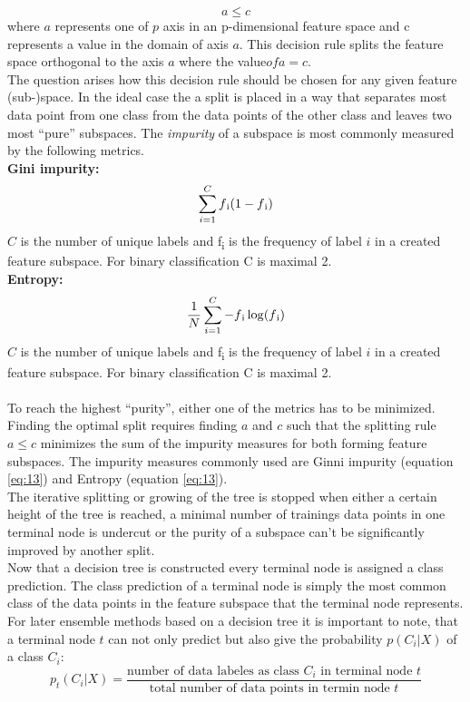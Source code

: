 \begin{equation} \label{eq:12}
a \leq c
\end{equation}
where $a$ represents one of $p$ axis in an p-dimensional feature space and c represents a value in the domain of axis $a$.
This decision rule splits the feature space orthogonal to the axis $a$ where the value$ of a = c$.
\\
The question arises how this decision rule should be chosen for any given feature (sub-)space.
In the ideal case the a split is placed in a way that separates most data point from one class from the data points of the other class and leaves two most ``pure'' subspaces. The \emph{impurity} of a subspace is most commonly measured by the following metrics. 
\\
\textbf{Gini impurity:}  \\
\begin{equation} \label{eq:13}
\sum_{i=1}^{C} f\textsubscript{i}(1-f\textsubscript{i})
\end{equation}
$C$ is the number of unique labels and f\textsubscript{i} is the frequency of label $i$ in a created feature subspace. For binary classification C is maximal 2.\\
\textbf{Entropy:}
\begin{equation} \label{eq:14}
\frac{1}{N}\sum_{i=1}^{C} -f\textsubscript{i}\log(f\textsubscript{i})
\end{equation}
$C$ is the number of unique labels and f\textsubscript{i} is the frequency of label $i$ in a created feature subspace. For binary classification C is maximal 2. \\
\\
To reach the highest ``purity'', either one of the metrics has to be minimized. \\
Finding the optimal split requires finding $a$ and $c$ such that the splitting rule  $a \leq c$ minimizes the sum of the impurity measures for both forming feature subspaces. The impurity measures commonly used are Ginni impurity (equation \ref{eq:13}) and Entropy (equation \ref{eq:13}). 
\\
The iterative splitting or growing of the tree is stopped when either a certain height of the tree is reached, a minimal number of trainings data points in one terminal node is undercut or the purity of a subspace can't be significantly improved by another split.
\\

Now that a decision tree is constructed every terminal node is assigned a class prediction. The class prediction of a terminal node is simply the most common class of the data points in the feature subspace that the terminal node represents. For later ensemble methods based on a decision tree it is important to note, that a terminal node $t$ can not only predict but also give the probability $p(C_i|X)$ of a class $C_i$:
\begin{equation} \label{eq:20}
p_t(C_i|X)=\frac{\text{number of data labeles as class }C_i\text{ in terminal node }t}{\text{total number of data points in termin node }t}
\end{equation}
\\


